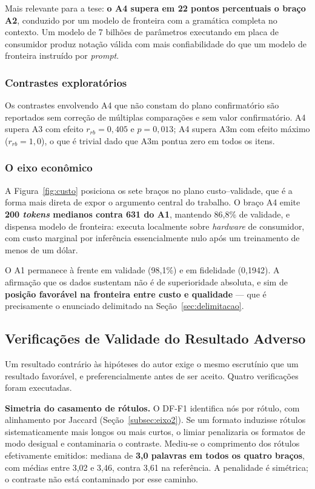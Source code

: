 Mais relevante para a tese: \textbf{o A4 supera em 22 pontos percentuais o braço A2}, conduzido por um modelo de fronteira com a gramática completa no contexto. Um modelo de 7 bilhões de parâmetros executando em placa de consumidor produz notação válida com mais confiabilidade do que um modelo de fronteira instruído por \textit{prompt}.

\subsubsection*{Contrastes exploratórios}

Os contrastes envolvendo A4 que não constam do plano confirmatório são reportados sem correção de múltiplas comparações e sem valor confirmatório. A4 supera A3 com efeito $r_{rb} = 0{,}405$ e $p = 0{,}013$; A4 supera A3m com efeito máximo ($r_{rb} = 1{,}0$), o que é trivial dado que A3m pontua zero em todos os itens.

\subsubsection*{O eixo econômico}



A Figura~\ref{fig:custo} posiciona os sete braços no plano custo--validade, que é a forma mais direta de expor o argumento central do trabalho. O braço A4 emite \textbf{200 \textit{tokens} medianos contra 631 do A1}, mantendo 86,8\% de validade, e dispensa modelo de fronteira: executa localmente sobre \textit{hardware} de consumidor, com custo marginal por inferência essencialmente nulo após um treinamento de menos de um dólar.

O A1 permanece à frente em validade (98,1\%) e em fidelidade (0,1942). A afirmação que os dados sustentam não é de superioridade absoluta, e sim de \textbf{posição favorável na fronteira entre custo e qualidade} --- que é precisamente o enunciado delimitado na Seção~\ref{sec:delimitacao}.

\subsection{Verificações de Validade do Resultado Adverso}
\label{subsec:res-verificacoes}

Um resultado contrário às hipóteses do autor exige o mesmo escrutínio que um resultado favorável, e preferencialmente antes de ser aceito. Quatro verificações foram executadas.

\textbf{Simetria do casamento de rótulos.} O DF-F1 identifica nós por rótulo, com alinhamento por Jaccard (Seção~\ref{subsec:eixo2}). Se um formato induzisse rótulos sistematicamente mais longos ou mais curtos, o limiar penalizaria os formatos de modo desigual e contaminaria o contraste. Mediu-se o comprimento dos rótulos efetivamente emitidos: mediana de \textbf{3,0 palavras em todos os quatro braços}, com médias entre 3,02 e 3,46, contra 3,61 na referência. A penalidade é simétrica; o contraste não está contaminado por esse caminho.

